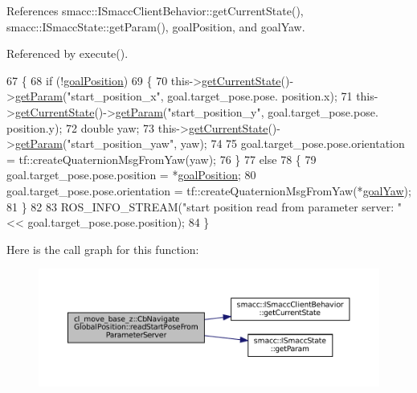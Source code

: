 References smacc\+::\+I\+Smacc\+Client\+Behavior\+::get\+Current\+State(), smacc\+::\+I\+Smacc\+State\+::get\+Param(), goal\+Position, and goal\+Yaw.



Referenced by execute().


\begin{DoxyCode}
67 \{
68   \textcolor{keywordflow}{if} (!\hyperlink{classcl__move__base__z_1_1CbNavigateGlobalPosition_a51a0266fd9a63e99f26e88933529c559}{goalPosition})
69   \{
70     this->\hyperlink{classsmacc_1_1ISmaccClientBehavior_a34fde34e48fa13db622ee60d8374d0b8}{getCurrentState}()->\hyperlink{classsmacc_1_1ISmaccState_abbb3a24b912c6e8de28f7b86123b6357}{getParam}(\textcolor{stringliteral}{"start\_position\_x"}, goal.target\_pose.pose.
      position.x);
71     this->\hyperlink{classsmacc_1_1ISmaccClientBehavior_a34fde34e48fa13db622ee60d8374d0b8}{getCurrentState}()->\hyperlink{classsmacc_1_1ISmaccState_abbb3a24b912c6e8de28f7b86123b6357}{getParam}(\textcolor{stringliteral}{"start\_position\_y"}, goal.target\_pose.pose.
      position.y);
72     \textcolor{keywordtype}{double} yaw;
73     this->\hyperlink{classsmacc_1_1ISmaccClientBehavior_a34fde34e48fa13db622ee60d8374d0b8}{getCurrentState}()->\hyperlink{classsmacc_1_1ISmaccState_abbb3a24b912c6e8de28f7b86123b6357}{getParam}(\textcolor{stringliteral}{"start\_position\_yaw"}, yaw);
74 
75     goal.target\_pose.pose.orientation = tf::createQuaternionMsgFromYaw(yaw);
76   \}
77   \textcolor{keywordflow}{else}
78   \{
79     goal.target\_pose.pose.position = *\hyperlink{classcl__move__base__z_1_1CbNavigateGlobalPosition_a51a0266fd9a63e99f26e88933529c559}{goalPosition};
80     goal.target\_pose.pose.orientation = tf::createQuaternionMsgFromYaw(*\hyperlink{classcl__move__base__z_1_1CbNavigateGlobalPosition_a839900de7f664b27c9be189fadbaa003}{goalYaw});
81   \}
82 
83   ROS\_INFO\_STREAM(\textcolor{stringliteral}{"start position read from parameter server: "} << goal.target\_pose.pose.position);
84 \}
\end{DoxyCode}
Here is the call graph for this function\+:
\nopagebreak
\begin{figure}[H]
\begin{center}
\leavevmode
\includegraphics[width=350pt]{classcl__move__base__z_1_1CbNavigateGlobalPosition_a868b25f238e3781c9a2e44b4e1502fcc_cgraph}
\end{center}
\end{figure}
